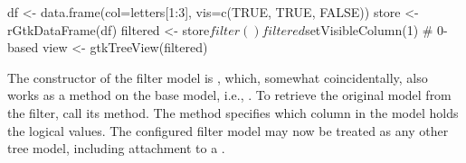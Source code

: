 \begin{Schunk}
\begin{Sinput}
 df <- data.frame(col=letters[1:3], vis=c(TRUE, TRUE, FALSE))
 store <- rGtkDataFrame(df)
 filtered <- store$filter()
 filtered$setVisibleColumn(1)            # 0-based
 view <- gtkTreeView(filtered)
\end{Sinput}
\end{Schunk}
%
The constructor of the filter model is ,
which, somewhat coincidentally, also works as a method on the base
model, i.e., . To retrieve the original model
from the filter, call its  method. The method
 specifies which column
in the model holds the logical values.  The configured filter model
may now be treated as any other tree model, including attachment to a
.


